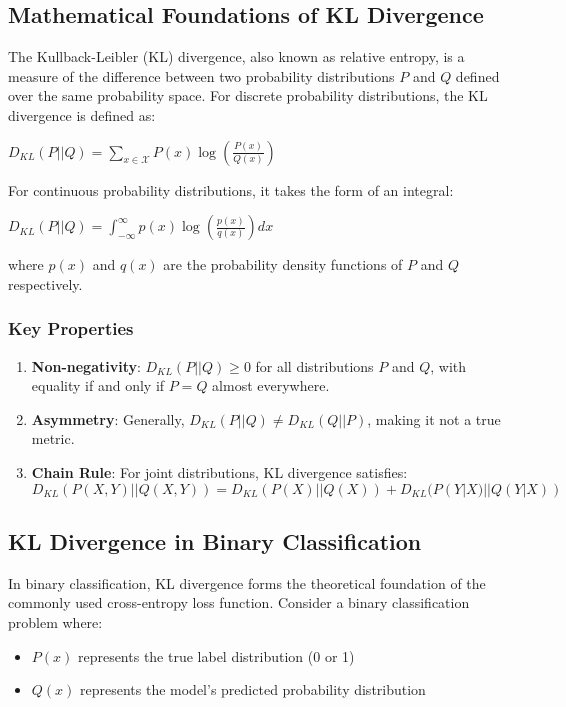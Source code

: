 \documentclass[preprint,12pt]{elsarticle}
\begin{document}
\subsection{Mathematical Foundations of KL Divergence}
The Kullback-Leibler (KL) divergence, also known as relative entropy, is a measure of the difference between two probability distributions $P$ and $Q$ defined over the same probability space. For discrete probability distributions, the KL divergence is defined as:

$
D_{KL}(P||Q) = \sum_{x \in \mathcal{X}} P(x) \log \left(\frac{P(x)}{Q(x)}\right)
$

For continuous probability distributions, it takes the form of an integral:

$
D_{KL}(P||Q) = \int_{-\infty}^{\infty} p(x) \log \left(\frac{p(x)}{q(x)}\right) dx
$

where $p(x)$ and $q(x)$ are the probability density functions of $P$ and $Q$ respectively.

\subsubsection{Key Properties}
\begin{enumerate}
    \item \textbf{Non-negativity}: $D_{KL}(P||Q) \geq 0$ for all distributions $P$ and $Q$, with equality if and only if $P = Q$ almost everywhere.
    
    \item \textbf{Asymmetry}: Generally, $D_{KL}(P||Q) \neq D_{KL}(Q||P)$, making it not a true metric.
    
    \item \textbf{Chain Rule}: For joint distributions, KL divergence satisfies:
    $D_{KL}(P(X,Y)||Q(X,Y)) = D_{KL}(P(X)||Q(X)) + D_{KL}(P(Y|X)||Q(Y|X))$
\end{enumerate}

\subsection{KL Divergence in Binary Classification}
In binary classification, KL divergence forms the theoretical foundation of the commonly used cross-entropy loss function. Consider a binary classification problem where:
\begin{itemize}
    \item $P(x)$ represents the true label distribution (0 or 1)
    \item $Q(x)$ represents the model's predicted probability distribution
\end{itemize}
\end{document}
